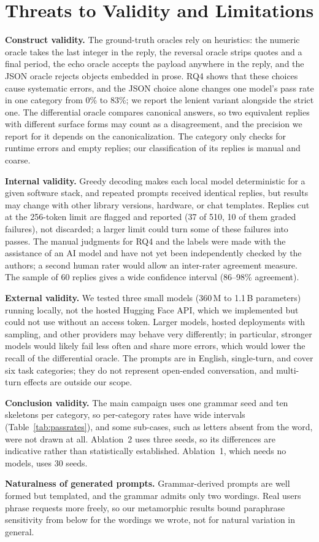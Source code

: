 \section{Threats to Validity and Limitations}\label{sec:threats}

\textbf{Construct validity.} The ground-truth oracles rely on heuristics: the numeric oracle takes the last integer in the reply, the reversal oracle strips quotes and a final period, the echo oracle accepts the payload anywhere in the reply, and the JSON oracle rejects objects embedded in prose. RQ4 shows that these choices cause systematic errors, and the JSON choice alone changes one model's pass rate in one category from 0\% to 83\%; we report the lenient variant alongside the strict one. The differential oracle compares canonical answers, so two equivalent replies with different surface forms may count as a disagreement, and the precision we report for it depends on the canonicalization. The  category only checks for runtime errors and empty replies; our classification of its replies is manual and coarse.

\textbf{Internal validity.} Greedy decoding makes each local model deterministic for a given software stack, and repeated prompts received identical replies, but results may change with other library versions, hardware, or chat templates. Replies cut at the 256-token limit are flagged and reported (37 of 510, 10 of them graded failures), not discarded; a larger limit could turn some of these failures into passes. The manual judgments for RQ4 and the  labels were made with the assistance of an AI model and have not yet been independently checked by the authors; a second human rater would allow an inter-rater agreement measure. The sample of 60 replies gives a wide confidence interval (86--98\% agreement).

\textbf{External validity.} We tested three small models (360\,M to 1.1\,B parameters) running locally, not the hosted Hugging Face API, which we implemented but could not use without an access token. Larger models, hosted deployments with sampling, and other providers may behave very differently; in particular, stronger models would likely fail less often and share more errors, which would lower the recall of the differential oracle. The prompts are in English, single-turn, and cover six task categories; they do not represent open-ended conversation, and multi-turn effects \citep{guo2026mortar} are outside our scope.

\textbf{Conclusion validity.} The main campaign uses one grammar seed and ten skeletons per category, so per-category rates have wide intervals (Table~\ref{tab:passrates}), and some sub-cases, such as letters absent from the word, were not drawn at all. Ablation~2 uses three seeds, so its differences are indicative rather than statistically established. Ablation~1, which needs no models, uses 30 seeds.

\textbf{Naturalness of generated prompts.} Grammar-derived prompts are well formed but templated, and the  grammar admits only two wordings. Real users phrase requests more freely, so our metamorphic results bound paraphrase sensitivity from below for the wordings we wrote, not for natural variation in general.
